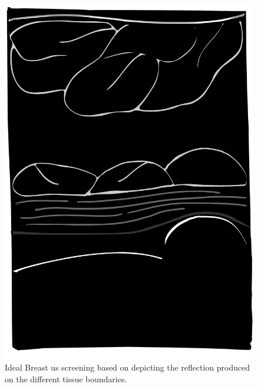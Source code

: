 \begin{frame}
\begin{columns}
\begin{column}{.48\textwidth}
\begin{overprint}
		\begin{figure}
\includegraphics[width=.7\textwidth]{slice/US.pdf}
	\caption{Ideal Breast \ac{us} screening based on depicting the reflection produced on the different tissue boundaries.}
		\end{figure}	
\end{overprint}
\end{column}
\end{columns}
\end{frame}

